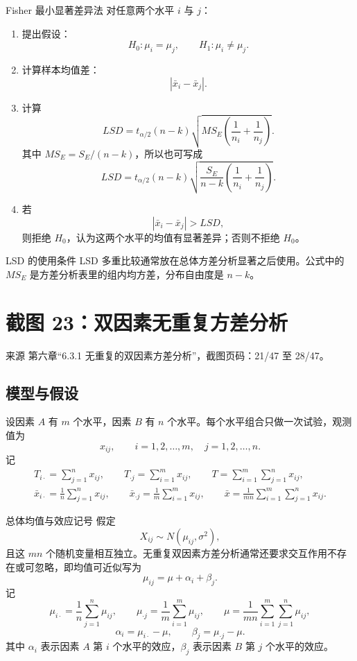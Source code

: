 \documentclass[UTF8,zihao=-4,fontset=fandol]{ctexart}
\begin{document}
\begin{methodbox}{Fisher 最小显著差异法}
对任意两个水平 $i$ 与 $j$：
\begin{enumerate}
  \item 提出假设：
  \[
  H_0:\mu_i=\mu_j,\qquad H_1:\mu_i\neq\mu_j.
  \]
  \item 计算样本均值差：
  \[
  |\bar{x}_i-\bar{x}_j|.
  \]
  \item 计算
  \[
  LSD=t_{\alpha/2}(n-k)
  \sqrt{MS_E\left(\frac{1}{n_i}+\frac{1}{n_j}\right)}.
  \]
  其中 $MS_E=S_E/(n-k)$，所以也可写成
  \[
  LSD=t_{\alpha/2}(n-k)
  \sqrt{\frac{S_E}{n-k}\left(\frac{1}{n_i}+\frac{1}{n_j}\right)}.
  \]
  \item 若
  \[
  |\bar{x}_i-\bar{x}_j|>LSD,
  \]
  则拒绝 $H_0$，认为这两个水平的均值有显著差异；否则不拒绝 $H_0$。
\end{enumerate}
\end{methodbox}

\begin{warnbox}{LSD 的使用条件}
LSD 多重比较通常放在总体方差分析显著之后使用。公式中的 $MS_E$ 是方差分析表里的组内均方差，分布自由度是 $n-k$。
\end{warnbox}

\section{截图 23：双因素无重复方差分析}

\begin{sourcebox}{来源}
第六章“6.3.1 无重复的双因素方差分析”，截图页码：21/47 至 28/47。
\end{sourcebox}

\subsection{模型与假设}

设因素 $A$ 有 $m$ 个水平，因素 $B$ 有 $n$ 个水平。每个水平组合只做一次试验，观测值为
\[
x_{ij},\qquad i=1,2,\ldots,m,\quad j=1,2,\ldots,n.
\]
记
\[
\begin{gathered}
T_{i\cdot}=\sum_{j=1}^{n}x_{ij},\qquad
T_{\cdot j}=\sum_{i=1}^{m}x_{ij},\qquad
T=\sum_{i=1}^{m}\sum_{j=1}^{n}x_{ij},\\
\bar{x}_{i\cdot}=\frac{1}{n}\sum_{j=1}^{n}x_{ij},\qquad
\bar{x}_{\cdot j}=\frac{1}{m}\sum_{i=1}^{m}x_{ij},\qquad
\bar{x}=\frac{1}{mn}\sum_{i=1}^{m}\sum_{j=1}^{n}x_{ij}.
\end{gathered}
\]

\begin{keybox}{总体均值与效应记号}
假定
\[
X_{ij}\sim N(\mu_{ij},\sigma^2),
\]
且这 $mn$ 个随机变量相互独立。无重复双因素方差分析通常还要求交互作用不存在或可忽略，即均值可近似写为
\[
\mu_{ij}=\mu+\alpha_i+\beta_j.
\]
记
\[
\mu_{i\cdot}=\frac{1}{n}\sum_{j=1}^{n}\mu_{ij},\qquad
\mu_{\cdot j}=\frac{1}{m}\sum_{i=1}^{m}\mu_{ij},\qquad
\mu=\frac{1}{mn}\sum_{i=1}^{m}\sum_{j=1}^{n}\mu_{ij},
\]
\[
\alpha_i=\mu_{i\cdot}-\mu,\qquad
\beta_j=\mu_{\cdot j}-\mu.
\]
其中 $\alpha_i$ 表示因素 $A$ 第 $i$ 个水平的效应，$\beta_j$ 表示因素 $B$ 第 $j$ 个水平的效应。
\end{keybox}
\end{document}
